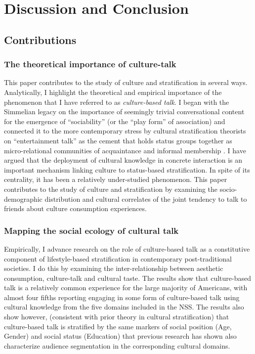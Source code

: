 \documentclass[11pt]{article}
\begin{document}
\section{Discussion and Conclusion}
\subsection{Contributions}
\subsubsection{The theoretical importance of culture-talk}
This paper contributes to the study of culture and stratification in several ways.  Analytically, I highlight the theoretical and empirical importance of the phenomenon that I have referred to as \emph{culture-based talk}. I began with the Simmelian legacy on the importance of seemingly trivial conversational content for the emergence of ``sociability'' (or the ``play form'' of association) and connected it to the more contemporary stress by cultural stratification theorists on ``entertainment talk'' as the cement that holds status groups together as micro-relational communities of acquaintance and informal membership \citep{collins75, dimaggio87, purcell07, lizardo06a}.  I have argued that the deployment of cultural knowledge in concrete interaction is an important mechanism linking culture to status-based stratification.  In spite of its centrality, it has been a relatively under-studied phenomenon. This paper contributes to the study of culture and stratification by examining the socio-demographic distribution and cultural correlates of the joint tendency to talk to friends about culture consumption experiences.  

\subsubsection{Mapping the social ecology of cultural talk}
Empirically, I advance research on the role of culture-based talk as a constitutive component of lifestyle-based stratification in contemporary post-traditional societies.  I do this by examining the inter-relationship between aesthetic consumption, culture-talk and cultural taste. The results show that culture-based talk is a relatively common experience for the large majority of Americans, with almost four fifths reporting engaging in some form of culture-based talk using cultural knowledge from the five domains included in the NSS. The results also show however, (consistent with prior theory in cultural stratification) that culture-based talk is stratified by the same markers of social position (Age, Gender) and social status (Education) that previous research has shown also characterize audience segmentation in the corresponding cultural domains.  
\end{document}
